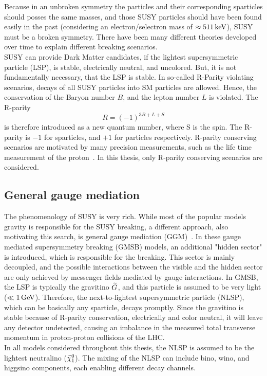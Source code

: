 Because in an unbroken symmetry the particles and their corresponding sparticles should posses the same masses, and those SUSY particles should have been found easily in the past (considering \eg an electron/selectron mass of $\approx511\,\text{ke\hspace{-.08em}V}$), SUSY must be a broken symmetry. There have been many different theories developed over time to explain different breaking scenarios.\\
SUSY can provide Dark Matter candidates, if the lightest supersymmetric particle (LSP), is stable, electrically neutral, and uncolored. But, it is not fundamentally necessary, that the LSP is stable. In so-called R-Parity violating scenarios, decays of all SUSY particles into SM particles are allowed. Hence, the conservation of the Baryon number $B$, and the lepton number $L$ is violated. The R-parity
\begin{equation}
 R = (-1)^{3B+L+S}
\end{equation}
is therefore introduced as a new quantum number, where S is the spin. The R-parity is $-1$ for sparticles, and $+1$ for particles respectively. R-parity conserving scenarios are motivated by many precision measurements, such as the life time measurement of the proton~\cite{ProtonDecay}.
In this thesis, only R-parity conserving scenarios are considered.\\



\subsection{General gauge mediation}\label{sec:GGM}
The phenomenology of SUSY is very rich. While most of the popular models gravity is responsible for the SUSY breaking, a different approach, also motivating this search, is general gauge mediation (GGM)~\cite{GGM}. In these gauge mediated supersymmetry breaking (GMSB) models, an additional "hidden sector" is introduced, which is responsible for the breaking. This sector is mainly decoupled, and the possible interactions between the visible and the hidden sector are only achieved by messenger fields mediated by gauge interactions. In GMSB, the LSP is typically the gravitino $\widetilde{G}$, and this particle is assumed to be very light ($\ll1\,\text{Ge\hspace{-.08em}V}$). Therefore, the next-to-lightest supersymmetric particle (NLSP), which can be basically any sparticle, decays promptly. Since the gravitino is stable because of R-parity conservation, electrically and color neutral, it will leave any detector undetected, causing an imbalance in the measured total transverse momentum in proton-proton collisions of the LHC.\\
In all models considered throughout this thesis, the NLSP is assumed to be the lightest neutralino ($\widetilde{\chi}^{0}_{1}$). The mixing of the NLSP can include bino, wino, and higgsino components, each enabling different decay channels.


